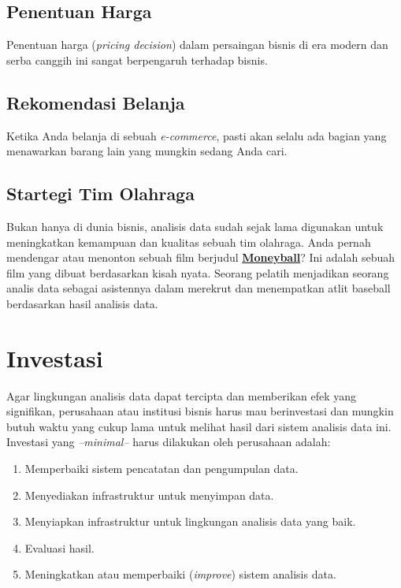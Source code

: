 \documentclass[]{book}
\providecommand{\tightlist}{%
  \setlength{\itemsep}{0pt}\setlength{\parskip}{0pt}}
\begin{document}
\hypertarget{penentuan-harga}{%
\subsection{Penentuan Harga}\label{penentuan-harga}}

Penentuan harga (\emph{pricing decision}) dalam persaingan bisnis di era modern dan serba canggih ini sangat berpengaruh terhadap bisnis.

\hypertarget{rekomendasi-belanja}{%
\subsection{Rekomendasi Belanja}\label{rekomendasi-belanja}}

Ketika Anda belanja di sebuah \emph{e-commerce}, pasti akan selalu ada bagian yang menawarkan barang lain yang mungkin sedang Anda cari.

\hypertarget{startegi-tim-olahraga}{%
\subsection{Startegi Tim Olahraga}\label{startegi-tim-olahraga}}

Bukan hanya di dunia bisnis, analisis data sudah sejak lama digunakan untuk meningkatkan kemampuan dan kualitas sebuah tim olahraga. Anda pernah mendengar atau menonton sebuah film berjudul \href{https://www.google.com/search?safe=strict\&ei=JBjRXNC4Mpvaz7sP9ra30AQ\&q=moneyball\&oq=moneyball\&gs_l=psy-ab.3..0i67l2j0i7i30l2j0i67j0i7i30l5.24699.24699..25317...0.0..0.260.260.2-1......0....1..gws-wiz.......0i71.JqVXxSHAnjo}{\textbf{Moneyball}}? Ini adalah sebuah film yang dibuat berdasarkan kisah nyata. Seorang pelatih menjadikan seorang analis data sebagai asistennya dalam merekrut dan menempatkan atlit baseball berdasarkan hasil analisis data.

\hypertarget{investasi}{%
\section{Investasi}\label{investasi}}

Agar lingkungan analisis data dapat tercipta dan memberikan efek yang signifikan, perusahaan atau institusi bisnis harus mau berinvestasi dan mungkin butuh waktu yang cukup lama untuk melihat hasil dari sistem analisis data ini. Investasi yang \emph{--minimal--} harus dilakukan oleh perusahaan adalah:

\begin{enumerate}
\def\labelenumi{\arabic{enumi}.}
\tightlist
\item
  Memperbaiki sistem pencatatan dan pengumpulan data.
\item
  Menyediakan infrastruktur untuk menyimpan data.
\item
  Menyiapkan infrastruktur untuk lingkungan analisis data yang baik.
\item
  Evaluasi hasil.
\item
  Meningkatkan atau memperbaiki (\emph{improve}) sistem analisis data.
\end{enumerate}
\end{document}

